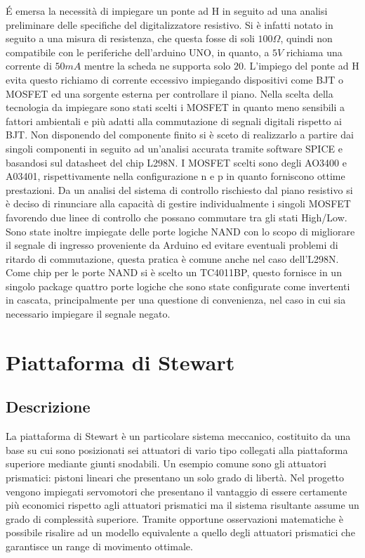 \documentclass[11pt]{article}
\begin{document}
É emersa la necessità di impiegare un ponte ad H in seguito ad una analisi preliminare delle specifiche del digitalizzatore resistivo. Si è infatti notato in seguito a una misura di resistenza, che questa fosse di soli $100 \Omega$, quindi non compatibile con le periferiche dell'arduino UNO, in quanto, a $5V$ richiama una corrente di $50mA$ mentre la scheda ne supporta solo $20$. L'impiego del ponte ad H evita questo richiamo di corrente eccessivo impiegando dispositivi come BJT o MOSFET ed una sorgente esterna per controllare il piano. Nella scelta della tecnologia da impiegare sono stati scelti i MOSFET in quanto meno sensibili a fattori ambientali e più adatti alla commutazione di segnali digitali rispetto ai BJT. Non disponendo del componente finito si è sceto di realizzarlo a partire dai singoli componenti in seguito ad un'analisi accurata tramite software SPICE e basandosi sul datasheet del chip L298N.
I MOSFET scelti sono degli AO3400 e A03401, rispettivamente nella configurazione n e p in quanto forniscono ottime prestazioni. Da un analisi del sistema di controllo rischiesto dal piano resistivo si è deciso di rinunciare alla capacità di gestire individualmente i singoli MOSFET favorendo due linee di controllo che possano commutare tra gli stati High/Low. Sono state inoltre impiegate delle porte logiche NAND con lo scopo di migliorare il segnale di ingresso proveniente da Arduino ed evitare eventuali problemi di ritardo di commutazione, questa pratica è comune anche nel caso dell'L298N. Come chip per le porte NAND si è scelto un TC4011BP, questo fornisce in un singolo package quattro porte logiche che sono state configurate come invertenti in cascata, principalmente per una questione di convenienza, nel caso in cui sia necessario impiegare il segnale negato.
 

\newpage
\section{Piattaforma di Stewart}\label{pianostewart}



\subsection{Descrizione}\label{piattaformastewart}
La piattaforma di Stewart è un particolare sistema meccanico, costituito da una base su cui sono posizionati sei attuatori di vario tipo collegati alla piattaforma superiore mediante giunti snodabili. Un esempio comune sono gli attuatori prismatici: pistoni lineari che presentano un solo grado di libertà. Nel progetto vengono impiegati servomotori che presentano il vantaggio di essere certamente più economici rispetto agli attuatori prismatici ma il sistema risultante assume un grado di complessità superiore. Tramite opportune osservazioni matematiche è possibile risalire ad un modello equivalente a quello degli attuatori prismatici che garantisce un range di movimento ottimale.
\end{document}
